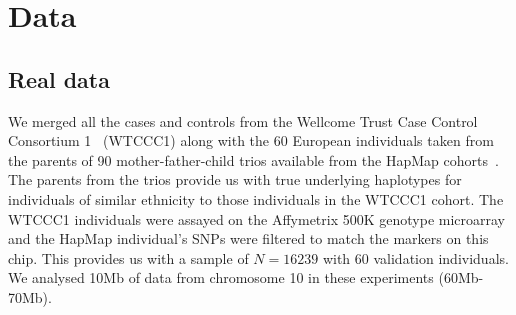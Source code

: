 

\section{Data}
\subsection{Real data}
We merged all the cases and controls from the Wellcome Trust Case Control Consortium 1~\citep{consortium2007} (WTCCC1) along with the 60 European individuals taken from the parents of 90 mother-father-child trios available from the HapMap cohorts~\citep{hapmap2}.  The parents from the trios provide us with true underlying haplotypes for individuals of similar ethnicity to those individuals in the WTCCC1 cohort.  The WTCCC1 individuals were assayed on the Affymetrix 500K genotype microarray and the HapMap individual's SNPs were filtered to match the markers on this chip.  This provides us with a sample of $N=16239$ with 60 validation individuals. We analysed 10Mb of data from chromosome 10 in these experiments (60Mb-70Mb).

